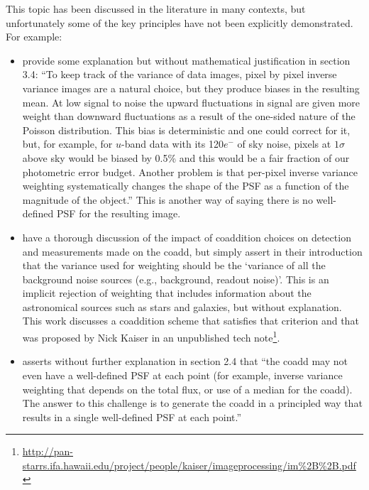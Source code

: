 \documentclass[modern]{style_and_logos/lsstdescnote}
\begin{document}
This topic has been discussed in the literature in many contexts, but unfortunately some of the key principles have not been explicitly demonstrated.  For example:
\begin{itemize}
\item \citet{2014ApJ...794..120A} provide some explanation but without mathematical justification in section 3.4: ``To keep track of the variance of data images, pixel by
pixel inverse variance images are a natural choice, but
they produce biases in the resulting mean. At low signal to noise the upward fluctuations in signal are given
more weight than downward fluctuations as a result of
the one-sided nature of the Poisson distribution. This
bias is deterministic and one could correct for it, but,
for example, for $u$-band data with its 120$e^{-}$ of sky noise,
pixels at $1\sigma$ above sky would be biased by 0.5\% and this
would be a fair fraction of our photometric error budget. Another problem is that per-pixel inverse variance
weighting systematically changes the shape of the PSF
as a function of the magnitude of the object.''  This is another way of saying there is no well-defined PSF for the resulting image.

\item \citet{2017ApJ...836..187Z} have a thorough discussion of the impact of coaddition choices on detection and measurements made on the coadd, but simply assert in their introduction that the variance used for weighting should be the `variance of all the background noise sources (e.g., background, readout noise)'.  This is an implicit rejection of weighting that includes information about the astronomical sources such as stars and galaxies, but without explanation. This work discusses a coaddition scheme that satisfies that criterion and that was proposed by Nick Kaiser in an unpublished tech note\footnote{\url{http://pan-starrs.ifa.hawaii.edu/project/people/kaiser/imageprocessing/im\%2B\%2B.pdf}}.

    \item \citet{2018ARA&A..56..393M} asserts without further explanation in section 2.4 that ``the coadd may not even have a well-defined PSF at each point (for example, inverse
variance weighting that depends on the total flux, or use of a median for the coadd). The
answer to this challenge is to generate the coadd in a principled way that results in a single
well-defined PSF at each point.''


\end{itemize}
\end{document}
